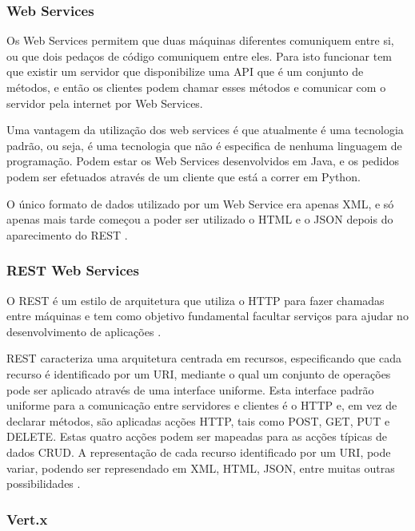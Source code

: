 \subsubsection{Web Services}

Os Web Services permitem que duas máquinas diferentes comuniquem entre si, ou que dois pedaços de código comuniquem entre eles. Para isto funcionar tem que existir um servidor que disponibilize uma \gls{API} que é um conjunto de métodos, e então os clientes podem chamar esses métodos e comunicar com o servidor pela internet por Web Services.

Uma vantagem da utilização dos web services é que atualmente é uma tecnologia padrão, ou seja, é uma tecnologia que não é especifica de nenhuma linguagem de programação. Podem estar os Web Services desenvolvidos em Java, e os pedidos podem ser efetuados através de um cliente que está a correr em Python.

O único formato de dados utilizado por um Web Service era apenas \gls{XML}, e só apenas mais tarde começou a poder ser utilizado o \gls{HTML} e o \gls{JSON} depois do aparecimento do \gls{REST} \cite{wsjakob}.

\subsubsection{ REST Web Services}

O \gls{REST} é um estilo de arquitetura que utiliza o \gls{HTTP} para fazer chamadas entre máquinas e tem como objetivo fundamental facultar serviços para ajudar no desenvolvimento de aplicações \cite{whatisrest}.

\gls{REST} caracteriza uma arquitetura centrada em recursos, especificando que cada recurso é identificado por um \gls{URI}, mediante o qual um conjunto de operações pode ser aplicado através de uma interface uniforme. Esta interface padrão uniforme para a comunicação entre servidores e clientes é o \gls{HTTP} e, em vez de declarar métodos, são aplicadas acções \gls{HTTP}, tais como POST, GET, PUT e DELETE. Estas quatro acções podem ser mapeadas para as acções típicas de dados \gls{CRUD}. A representação de cada recurso identificado por um URI, pode variar, podendo ser represendado em \gls{XML}, \gls{HTML}, \gls{JSON}, entre muitas outras possibilidades \cite{restwebservices}.

\subsubsection{Vert.x}

